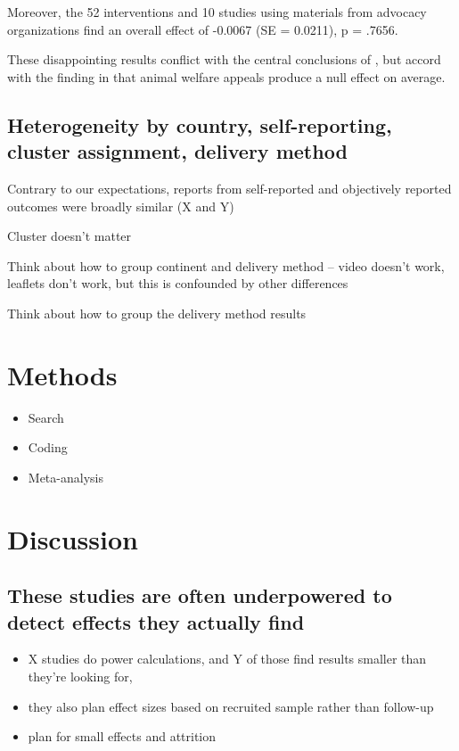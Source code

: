 \documentclass[sn-nature,pdflatex]{sn-jnl}
\providecommand{\tightlist}{%
  \setlength{\itemsep}{0pt}\setlength{\parskip}{0pt}}
\begin{document}
Moreover, the 52 interventions and 10 studies using materials from
advocacy organizations find an overall effect of -0.0067 (SE = 0.0211),
p = .7656.

These disappointing results conflict with the central conclusions of
\citep{mathur2021effectiveness}, but accord with the finding in
\citep{DiGennaro2024} that animal welfare appeals produce a null effect
on average.

\subsection{Heterogeneity by country, self-reporting, cluster
assignment, delivery method}\label{sec2.10}

Contrary to our expectations, reports from self-reported and objectively
reported outcomes were broadly similar (X and Y)

Cluster doesn't matter

Think about how to group continent and delivery method -- video doesn't
work, leaflets don't work, but this is confounded by other differences

Think about how to group the delivery method results

\section{Methods}\label{sec3}

\begin{itemize}
\tightlist
\item
  Search
\item
  Coding
\item
  Meta-analysis
\end{itemize}

\section{Discussion}\label{sec4}

\subsection{These studies are often underpowered to detect effects they
actually find}\label{Sec4.1}

\begin{itemize}
\tightlist
\item
  X studies do power calculations, and Y of those find results smaller
  than they're looking for,
\item
  they also plan effect sizes based on recruited sample rather than
  follow-up
\item
  plan for small effects and attrition
\end{itemize}
\end{document}
